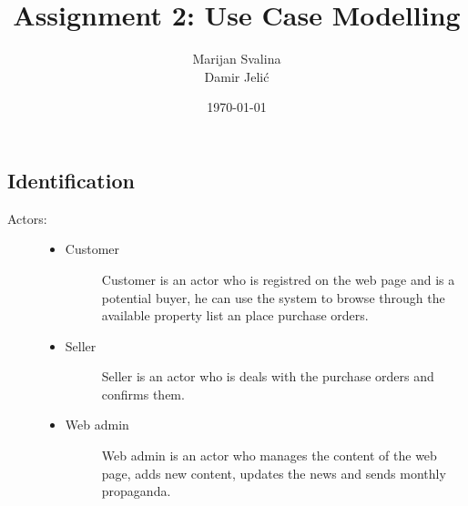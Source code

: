 \documentclass[12pt, titlepage]{article}
\title{Assignment 2: Use Case Modelling}
\date{\today}
\author{Marijan Svalina \\ Damir Jelić}
\begin{document}
\maketitle 

\setcounter{section}{2}
\subsection{Identification}

\begin{description}
    \item[Actors:] \hfil
    \begin{itemize}
    \item
        Customer
        \begin{description}
            \item[]Customer is an actor who is registred on the web page and is a potential buyer, 
            he can use the system to browse through the available 
            property list an place purchase orders. 
        \end{description}
    \item
        Seller
        \begin{description}
            \item[]Seller is an actor who is deals with the purchase orders and confirms them.
        \end{description}
    \item
        Web admin
        \begin{description}
            \item[]Web admin is an actor who manages the content of the web page, 
            adds new content, updates the news and sends monthly propaganda.
        \end{description}
    \end{itemize}



\end{description}
\end{document}
